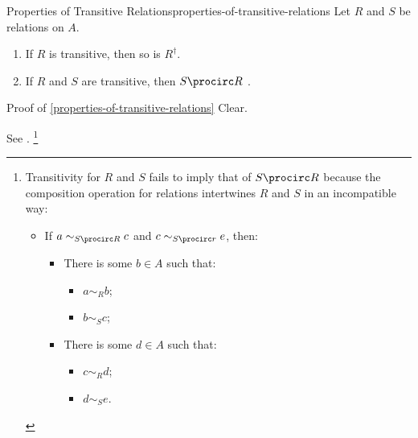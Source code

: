 \begin{proposition}{Properties of Transitive Relations}{properties-of-transitive-relations}%
    Let $R$ and $S$ be relations on $A$.
    \begin{enumerate}
        \item\label{properties-of-transitive-relations-interaction-with-inverses}If $R$ is transitive, then so is $R^{\dagger}$.
        \item\label{properties-of-transitive-relations-interaction-with-composition}If $R$ and $S$ are transitive, then $S\procirc R$ .
    \end{enumerate}
\end{proposition}
\begin{Proof}{Proof of \cref{properties-of-transitive-relations}}%
    Clear.

    See \cite{MSE2096272}.%
    \footnote{%
        Transitivity for $R$ and $S$ fails to imply that of $S\procirc R$ because the composition operation for relations intertwines $R$ and $S$ in an incompatible way:
        \begin{itemize}
            \item If $a\sim_{S\procirc R}c$ and $c\sim_{S\procirc r}e$, then:
                \begin{itemize}
                    \item There is some $b\in A$ such that:
                        \begin{itemize}
                            \item $a\sim_{R}b$;
                            \item $b\sim_{S}c$;
                        \end{itemize}
                    \item There is some $d\in A$ such that:
                        \begin{itemize}
                            \item $c\sim_{R}d$;
                            \item $d\sim_{S}e$.
                        \end{itemize}
                \end{itemize}
        \end{itemize}
        \par\vspace*{\TCBBoxCorrection}
    }%
\end{Proof}
